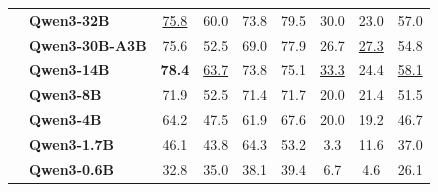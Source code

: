 \documentclass[dvipsnames]{article}
\begin{document}
\begin{table}[tbp]
{\begin{tabular}{clccccccc}
 & \textbf{Qwen3-32B} & \underline{75.8} & 60.0 & 73.8 & 79.5 & 30.0 & 23.0 & 57.0 \\
 & \textbf{Qwen3-30B-A3B} & 75.6 & 52.5 & 69.0 & 77.9 & 26.7 & \underline{27.3} & 54.8 \\
 & \textbf{Qwen3-14B} & \textbf{78.4} & \underline{63.7} & 73.8 & 75.1 & \underline{33.3} & 24.4 & \underline{58.1} \\
 & \textbf{Qwen3-8B} & 71.9 & 52.5 & 71.4 & 71.7 & 20.0 & 21.4 & 51.5 \\
 & \textbf{Qwen3-4B} & 64.2 & 47.5 & 61.9 & 67.6 & 20.0 & 19.2 & 46.7 \\
 & \textbf{Qwen3-1.7B} & 46.1 & 43.8 & 64.3 & 53.2 & 3.3 & 11.6 & 37.0 \\
 & \textbf{Qwen3-0.6B} & 32.8 & 35.0 & 38.1 & 39.4 & 6.7 & 4.6 & 26.1 \\
\bottomrule
\end{tabular}
}
\end{table}
\end{document}
